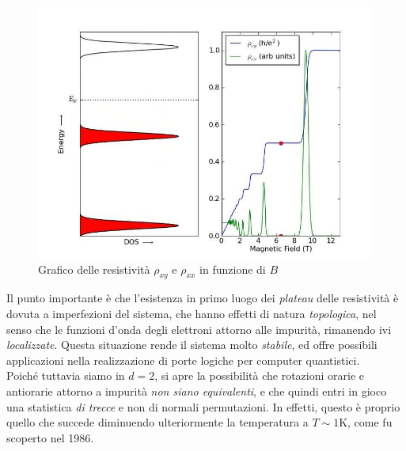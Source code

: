 \documentclass[../../FisicaTeorica.tex]{subfiles}
\begin{document}
\begin{figure}[H]
\centering
\includegraphics[scale=0.5]{Immagini/12_12/image012.jpg}
\caption{Grafico delle resistività $\rho_{xy}$ e $\rho_{xx}$ in funzione di $B$\label{fig:graph-res-hall}}
\end{figure}

Il punto importante è che l'esistenza in primo luogo dei \textit{plateau} delle resistività è dovuta a imperfezioni del sistema, che hanno effetti di natura \textit{topologica}, nel senso che le funzioni d'onda degli elettroni  attorno alle impurità, rimanendo ivi \textit{localizzate}. Questa situazione rende il sistema molto \textit{stabile}, ed offre possibili applicazioni nella realizzazione di porte logiche per computer quantistici.\\

Poiché tuttavia siamo in $d=2$, si apre la possibilità che rotazioni orarie e antiorarie attorno a impurità \textit{non siano equivalenti}, e che quindi entri in gioco una statistica \textit{di trecce} e non di normali permutazioni. In effetti, questo è proprio quello che succede diminuendo ulteriormente la temperatura a $T\sim 1$K, come fu  scoperto nel 1986.\\
\end{document}
